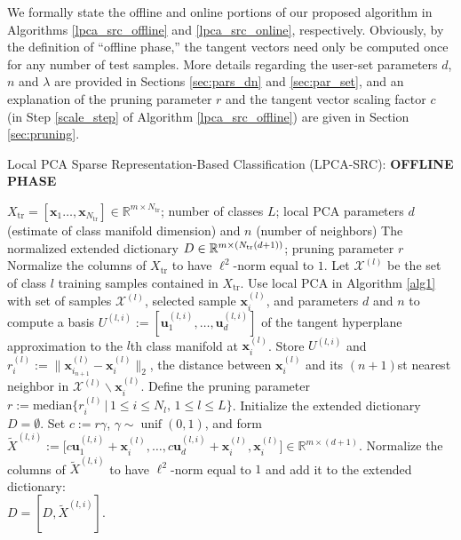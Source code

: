 \documentclass[review]{elsarticle}
\newcommand{\unif}{\operatorname{unif}}
\begin{document}
We formally state the offline and online portions of our proposed algorithm in Algorithms \ref{lpca_src_offline} and \ref{lpca_src_online}, respectively. Obviously, by the definition of ``offline phase,'' the tangent vectors need only be computed once for any number of test samples. More details regarding the user-set parameters $d$, $n$ and $\lambda$ are provided in Sections \ref{sec:pars_dn} and \ref{sec:par_set}, and an explanation of the pruning parameter $r$ and the tangent vector scaling factor $c$ (in Step \ref{scale_step} of Algorithm \ref{lpca_src_offline}) are given in Section \ref{sec:pruning}. 

\begin{algorithm}
\caption{Local PCA Sparse Representation-Based Classification (LPCA-SRC): \textbf{OFFLINE PHASE}}
\label{lpca_src_offline} 
\begin{algorithmic}[1]
\REQUIRE $X_\mathrm{tr} = [\bm{x}_1 \ldots, \bm{x}_{N_{\mathrm{tr}}}] \in \mathbb{R}^{m\times N_\mathrm{tr}}$; number of classes $L$; local PCA parameters $d$ (estimate of class manifold dimension) and $n$ (number of neighbors)
\ENSURE The normalized extended dictionary $D \in \mathbb{R}^{m\times (N_\mathrm{\textnormal{tr}}(d+1))}$; pruning parameter $r$
\STATE Normalize the columns of $X_\mathrm{tr}$ to have $\ell^2$-norm equal to $1$.
\STATE Let $\mathcal{X}^{(l)}$ be the set of class $l$ training samples contained in $X_\mathrm{tr}$. 
\STATE Use local PCA in Algorithm \ref{alg1} with set of samples $\mathcal{X}^{(l)}$, selected sample $\bm{x}_i^{(l)}$, and parameters $d$ and $n$ to compute a basis $U^{(l,i)} := [\bm{u}_1^{(l,i)},\ldots,\bm{u}_{d}^{(l,i)}]$ of the tangent hyperplane approximation to the $l$th class manifold at $\bm{x}_i^{(l)}$. Store $U^{(l,i)}$ and $r_i^{(l)} := \| \bm{x}_{i_{n+1}}^{(l)}-\bm{x}_i^{(l)} \|_2$, the distance between $\bm{x}_i^{(l)}$ and its $(n+1)$st nearest neighbor in $\mathcal{X}^{(l)}\backslash \bm{x}_i^{(l)}$. 
\ENDFOR
\ENDFOR
\STATE Define the pruning parameter $r := \text{median} \big\{ r_i^{(l)}\, | \, 1\leq i \leq N_l, \, 1\leq l \leq L \big\}$.
\STATE Initialize the extended dictionary $D = \emptyset$. 
\STATE\label{scale_step} Set $c:= r \gamma$, $\gamma \sim \unif(0,1)$, and form $\tilde{X}^{(l,i)} := \big[c\bm{u}_1^{(l,i)} + \bm{x}_i^{(l)},\ldots,c\bm{u}_{d}^{(l,i)} + \bm{x}_i^{(l)}, \bm{x}_i^{(l)}\big] \in \mathbb{R}^{m\times(d+1)}$. \label{scale}
\STATE Normalize the columns of $\tilde{X}^{(l,i)}$ to have $\ell^2$-norm equal to $1$ and add it to the extended dictionary: \\
$D = [D,\tilde{X}^{(l,i)}]$.
\ENDFOR
\ENDFOR
\end{algorithmic}
\end{algorithm}
\end{document}
